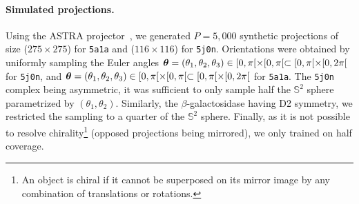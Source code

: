\paragraph{Simulated projections.}
Using the ASTRA projector~\cite{van2015astra}, we generated $P=5,000$ synthetic projections of size ($275\times 275$) for \texttt{5a1a} and ($116\times 116$) for \texttt{5j0n}. 
 Orientations were obtained by uniformly sampling the Euler angles ${\boldsymbol{\theta}}=(\theta_1,\theta_2,\theta_3) \in [0, \pi[ \times [0, \pi[ \subset [0, \pi[ \times [0, 2\pi[$ for \texttt{5j0n}, and ${\boldsymbol{\theta}}=(\theta_1,\theta_2,\theta_3) \in [0, \pi[ \times [0, \pi[ \subset [0, \pi[ \times [0, 2\pi[$ for \texttt{5a1a}.
The \texttt{5j0n} complex being asymmetric, it was sufficient to only sample half  the $\mathbb{S}^2$ sphere parametrized by $(\theta_1,\theta_2)$.
Similarly, the $\beta$-galactosidase having D2 symmetry, %
 we restricted the sampling to a quarter of the $\mathbb{S}^2$ sphere.
Finally, as it is not possible to resolve chirality\footnote{An object is chiral if it cannot be superposed on its mirror image by any combination of translations or rotations.} (opposed projections being mirrored), we only trained on half coverage.


